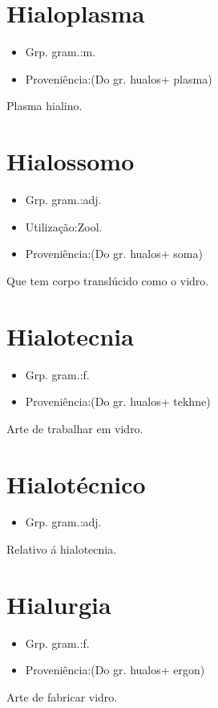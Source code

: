 \documentclass{article}
\begin{document}
\section{Hialoplasma}
\begin{itemize}
\item {Grp. gram.:m.}
\end{itemize}
\begin{itemize}
\item {Proveniência:(Do gr. \textunderscore hualos\textunderscore  + \textunderscore plasma\textunderscore )}
\end{itemize}
Plasma hialino.
\section{Hialossomo}
\begin{itemize}
\item {Grp. gram.:adj.}
\end{itemize}
\begin{itemize}
\item {Utilização:Zool.}
\end{itemize}
\begin{itemize}
\item {Proveniência:(Do gr. \textunderscore hualos\textunderscore  + \textunderscore soma\textunderscore )}
\end{itemize}
Que tem corpo translúcido como o vidro.
\section{Hialotecnia}
\begin{itemize}
\item {Grp. gram.:f.}
\end{itemize}
\begin{itemize}
\item {Proveniência:(Do gr. \textunderscore hualos\textunderscore  + \textunderscore tekhne\textunderscore )}
\end{itemize}
Arte de trabalhar em vidro.
\section{Hialotécnico}
\begin{itemize}
\item {Grp. gram.:adj.}
\end{itemize}
Relativo á hialotecnia.
\section{Hialurgia}
\begin{itemize}
\item {Grp. gram.:f.}
\end{itemize}
\begin{itemize}
\item {Proveniência:(Do gr. \textunderscore hualos\textunderscore  + \textunderscore ergon\textunderscore )}
\end{itemize}
Arte de fabricar vidro.
\end{document}
